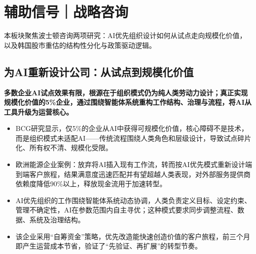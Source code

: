 \documentclass[11pt]{ctexart}
\begin{document}
\section{辅助信号｜战略咨询}
本板块聚焦波士顿咨询两项研究：AI优先组织设计如何从试点走向规模化价值，以及韩国股市重估的结构性分化与政策驱动逻辑。
\subsection{为AI重新设计公司：从试点到规模化价值}
\textbf{多数企业AI试点效果有限，根源在于组织模式仍为纯人类劳动力设计；真正实现规模化价值的5\%企业，通过围绕智能体系统重构工作结构、治理与流程，将AI从工具升级为运营核心。}
\begin{itemize}
  \item BCG研究显示，仅5\%的企业从AI中获得可规模化价值，核心障碍不是技术，而是组织模式未适配AI——传统流程围绕人类角色和层级设计，导致试点碎片化、所有权不清、规模化受限。
  \item 欧洲能源企业案例：放弃将AI插入现有工作流，转而按AI优先模式重新设计端到端客户旅程，结果满意度迅速匹配并有望超越人类表现，对外部服务提供商依赖度降低90\%以上，释放现金流用于加速转型。
  \item AI优先组织的工作围绕智能体系统动态协调，人类负责定义目标、设定约束、管理不确定性，AI在参数范围内自主寻优；这种模式要求同步调整流程、数据、系统及治理结构。
  \item 该企业采用“自筹资金”策略，优先改造能快速创造价值的客户旅程，前三个月即产生运营成本节省，验证了“先验证、再扩展”的转型节奏。
\end{itemize}
\end{document}
